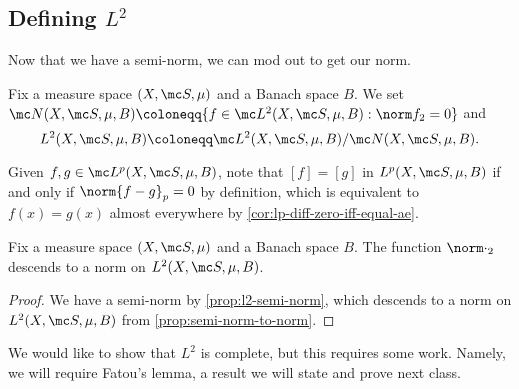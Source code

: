 \documentclass[../notes.tex]{subfiles}
\begin{document}
\subsection{Defining \texorpdfstring{$L^2$}{ L2}}
Now that we have a semi-norm, we can mod out to get our norm.
\begin{notation}
	Fix a measure space $(X,\mc S,\mu)$ and a Banach space $B$. We set $\mc N(X,\mc S,\mu,B)\coloneqq\{f\in\mc L^2(X,\mc S,\mu,B):\norm f_2=0\}$ and
	\[L^2(X,\mc S,\mu,B)\coloneqq\mc L^2(X,\mc S,\mu,B)/\mc N(X,\mc S,\mu,B).\]
\end{notation}
\begin{remark}
	Given $f,g\in\mc L^p(X,\mc S,\mu,B)$, note that $[f]=[g]$ in $L^p(X,\mc S,\mu,B)$ if and only if $\norm{f-g}_p=0$ by definition, which is equivalent to $f(x)=g(x)$ almost everywhere by \autoref{cor:lp-diff-zero-iff-equal-ae}.
\end{remark}
\begin{proposition}
	Fix a measure space $(X,\mc S,\mu)$ and a Banach space $B$. The function $\norm\cdot_2$ descends to a norm on $L^2(X,\mc S,\mu,B)$.
\end{proposition}
\begin{proof}
	We have a semi-norm by \autoref{prop:l2-semi-norm}, which descends to a norm on $L^2(X,\mc S,\mu,B)$ from \autoref{prop:semi-norm-to-norm}.
\end{proof}
We would like to show that $L^2$ is complete, but this requires some work. Namely, we will require Fatou's lemma, a result we will state and prove next class.
\end{document}
